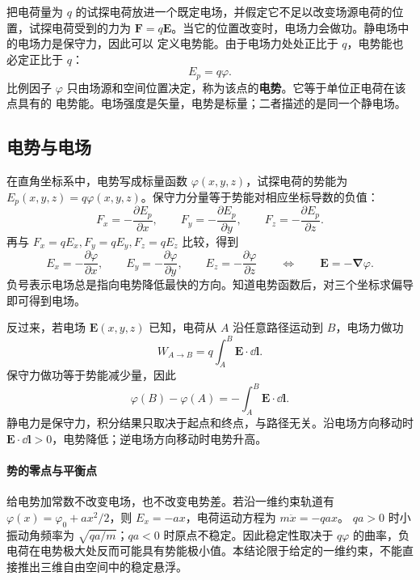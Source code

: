 把电荷量为 $q$ 的试探电荷放进一个既定电场，并假定它不足以改变场源电荷的位置，试探电荷受到的力为
$\boldsymbol F=q\boldsymbol E$。当它的位置改变时，电场力会做功。静电场中的电场力是保守力，因此可以
定义电势能。由于电场力处处正比于 $q$，电势能也必定正比于 $q$：
\begin{equation}
  \boxed{E_p=q\varphi}.
\end{equation}
比例因子 $\varphi$ 只由场源和空间位置决定，称为该点的\textbf{电势}。它等于单位正电荷在该点具有的
电势能。电场强度是矢量，电势是标量；二者描述的是同一个静电场。


\subsection{电势与电场}


在直角坐标系中，电势写成标量函数 $\varphi(x,y,z)$，试探电荷的势能为
$E_p(x,y,z)=q\varphi(x,y,z)$。保守力分量等于势能对相应坐标导数的负值：
\[
  F_x=-\frac{\partial E_p}{\partial x},\qquad
  F_y=-\frac{\partial E_p}{\partial y},\qquad
  F_z=-\frac{\partial E_p}{\partial z}.
\]
再与 $F_x=qE_x,F_y=qE_y,F_z=qE_z$ 比较，得到
\begin{equation}
  \boxed{E_x=-\frac{\partial\varphi}{\partial x},\qquad
  E_y=-\frac{\partial\varphi}{\partial y},\qquad
  E_z=-\frac{\partial\varphi}{\partial z}}
  \qquad\Longleftrightarrow\qquad
  \boxed{\boldsymbol E=-\boldsymbol\nabla\varphi}.
\end{equation}
负号表示电场总是指向电势降低最快的方向。知道电势函数后，对三个坐标求偏导即可得到电场。

反过来，若电场 $\boldsymbol E(x,y,z)$ 已知，电荷从 $A$ 沿任意路径运动到 $B$，电场力做功
\[
  W_{A\to B}=q\int_A^B\boldsymbol E\cdot\dd\boldsymbol l.
\]
保守力做功等于势能减少量，因此
\begin{equation}
  \boxed{\varphi(B)-\varphi(A)
  =-\int_A^B\boldsymbol E\cdot\dd\boldsymbol l}.
\end{equation}
静电力是保守力，积分结果只取决于起点和终点，与路径无关。沿电场方向移动时
$\boldsymbol E\cdot\dd\boldsymbol l>0$，电势降低；逆电场方向移动时电势升高。


\paragraph{势的零点与平衡点}
给电势加常数不改变电场，也不改变电势差。若沿一维约束轨道有
$\varphi(x)=\varphi_0+ax^2/2$，则 $E_x=-ax$，电荷运动方程为 $m\ddot x=-qa x$。
$qa>0$ 时小振动角频率为 $\sqrt{qa/m}$；$qa<0$ 时原点不稳定。因此稳定性取决于 $q\varphi$ 的曲率，负电荷在电势极大处反而可能具有势能极小值。本结论限于给定的一维约束，不能直接推出三维自由空间中的稳定悬浮。



